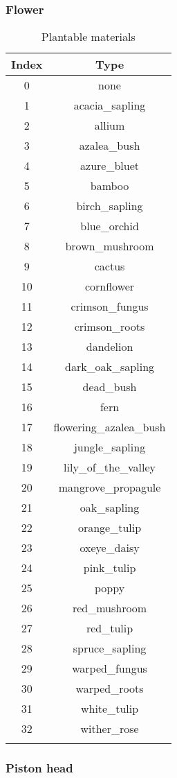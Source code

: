 \subsubsection{Flower}

\begin{longtable}{ |c|c| }
	\hline
	Index & Type \\
	\hline
	\endhead
	0 & none \\
	1 & acacia\_sapling \\
	2 & allium \\
	3 & azalea\_bush \\
	4 & azure\_bluet \\
	5 & bamboo \\
	6 & birch\_sapling \\
	7 & blue\_orchid \\
	8 & brown\_mushroom \\
	9 & cactus \\
	10 & cornflower \\
	11 & crimson\_fungus \\
	12 & crimson\_roots \\
	13 & dandelion \\
	14 & dark\_oak\_sapling \\
	15 & dead\_bush \\
	16 & fern \\
	17 & flowering\_azalea\_bush \\
	18 & jungle\_sapling \\
	19 & lily\_of\_the\_valley \\
	20 & mangrove\_propagule \\
	21 & oak\_sapling \\
	22 & orange\_tulip \\
	23 & oxeye\_daisy \\
	24 & pink\_tulip \\
	25 & poppy \\
	26 & red\_mushroom \\
	27 & red\_tulip \\
	28 & spruce\_sapling \\
	29 & warped\_fungus \\
	30 & warped\_roots \\
	31 & white\_tulip \\
	32 & wither\_rose \\
	\hline
	\caption{Plantable materials}
\end{longtable}

\subsubsection{Piston head}

